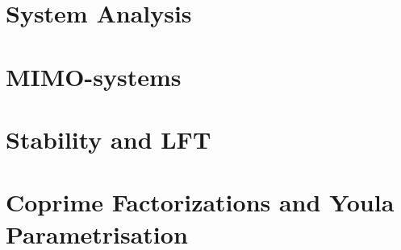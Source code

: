 \documentclass{scrreprt}
\subtitle{Coursework}
\begin{document}
\maketitle

\tableofcontents 

\cleardoublepage

\pagestyle{plain}


\chapter{System Analysis}



\chapter{MIMO-systems}



\chapter{Stability and LFT}


\chapter{Coprime Factorizations and Youla Parametrisation}






\end{document}
